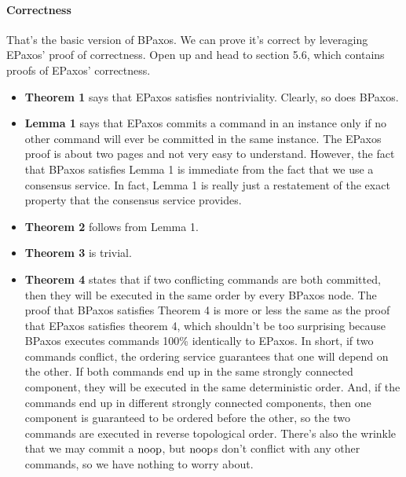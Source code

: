 \documentclass{mwhittaker}
\begin{document}
\paragraph{Correctness}
That's the basic version of BPaxos. We can prove it's correct by leveraging
EPaxos' proof of correctness. Open up \cite{moraru2013proof} and head to
section 5.6, which contains proofs of EPaxos' correctness.
\begin{itemize}
  \item
    \textbf{Theorem 1} says that EPaxos satisfies nontriviality. Clearly, so
    does BPaxos.

  \item
    \textbf{Lemma 1} says that EPaxos commits a command in an instance only if
    no other command will ever be committed in the same instance. The EPaxos
    proof is about two pages and not very easy to understand. However, the fact
    that BPaxos satisfies Lemma 1 is immediate from the fact that we use a
    consensus service. In fact, Lemma 1 is really just a restatement of the
    exact property that the consensus service provides.

  \item
    \textbf{Theorem 2} follows from Lemma 1.

  \item
    \textbf{Theorem 3} is trivial.

  \item
    \textbf{Theorem 4} states that if two conflicting commands are both
    committed, then they will be executed in the same order by every BPaxos
    node. The proof that BPaxos satisfies Theorem 4 is more or less the same as
    the proof that EPaxos satisfies theorem 4, which shouldn't be too
    surprising because BPaxos executes commands 100\% identically to EPaxos. In
    short, if two commands conflict, the ordering service guarantees that one
    will depend on the other. If both commands end up in the same strongly
    connected component, they will be executed in the same deterministic order.
    And, if the commands end up in different strongly connected components,
    then one component is guaranteed to be ordered before the other, so the two
    commands are executed in reverse topological order. There's also the
    wrinkle that we may commit a $\text{noop}$, but $\text{noop}$s don't conflict with any
    other commands, so we have nothing to worry about.
\end{itemize}

\end{document}

